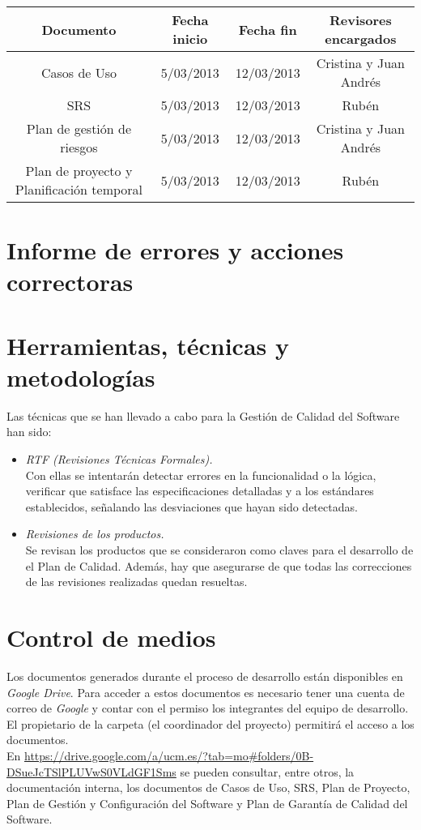\documentclass[11pt, a4paper, twoside, titlepage]{article}
\begin{document}
			\begin{center}
				\begin{tabular}{|c |c |c |c |}
				\hline
				\textbf{Documento} & \textbf{Fecha inicio} & \textbf{Fecha fin} &\textbf{Revisores encargados}\\
				\hline
				Casos de Uso & 5/03/2013 & 12/03/2013 & Cristina y Juan Andrés\\
				\hline
				SRS & 5/03/2013 & 12/03/2013 & Rubén\\
				\hline
				Plan de gestión de riesgos & 5/03/2013 & 12/03/2013 & Cristina y Juan Andrés\\
				\hline
				Plan de proyecto y Planificación temporal & 5/03/2013 & 12/03/2013 & Rubén\\
				\hline
				\end{tabular}
			\end{center}
		
	\section{Informe de errores y acciones correctoras}%
		
	\section{Herramientas, técnicas y metodologías}%
		Las técnicas que se han llevado a cabo para la Gestión de Calidad del Software han sido:
			\begin{itemize}
				\item \textsl{RTF (Revisiones Técnicas Formales).} \\
				Con ellas se intentarán detectar errores en la funcionalidad o la lógica, verificar que satisface las especificaciones
				detalladas y a los estándares establecidos, señalando las desviaciones que hayan sido detectadas.
				\item \textsl{Revisiones de los productos.} \\
				Se revisan los productos que se consideraron como claves para el desarrollo de el Plan de Calidad. Además,
				hay que asegurarse de que todas las correcciones de las revisiones realizadas quedan resueltas.
			\end{itemize}
	\section{Control de medios}%
		Los documentos generados durante el proceso de desarrollo están disponibles en \textit{Google Drive}. Para acceder a estos documentos es necesario tener una cuenta de correo de \textit{Google} y contar con el permiso los integrantes del equipo de desarrollo. El propietario de la carpeta (el coordinador del proyecto) permitirá el acceso a los documentos. \\
		En \url{https://drive.google.com/a/ucm.es/?tab=mo#folders/0B-DSueJcTSlPLUVwS0VLdGF1Sms} se pueden consultar, entre otros, la documentación interna, los documentos de Casos de Uso, SRS, Plan de Proyecto, Plan de Gestión y Configuración del Software y Plan de Garantía de Calidad del Software.
\end{document}
